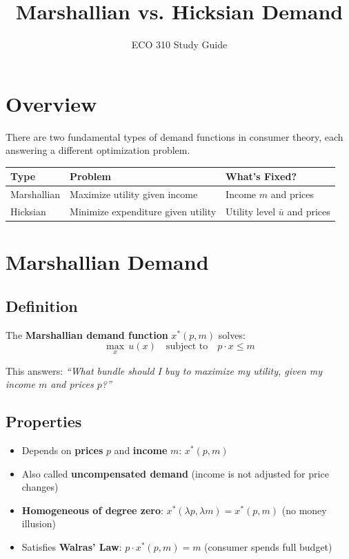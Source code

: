 \documentclass[11pt]{article}
\title{Marshallian vs. Hicksian Demand}
\author{ECO 310 Study Guide}
\date{}
\begin{document}
\maketitle

\section{Overview}

There are two fundamental types of demand functions in consumer theory, each answering a different optimization problem.

\begin{center}
\begin{tabular}{|l|l|l|}
\hline
\textbf{Type} & \textbf{Problem} & \textbf{What's Fixed?} \\
\hline
Marshallian & Maximize utility given income & Income $m$ and prices \\
Hicksian & Minimize expenditure given utility & Utility level $\bar{u}$ and prices \\
\hline
\end{tabular}
\end{center}

\section{Marshallian Demand}

\subsection{Definition}

The \textbf{Marshallian demand function} $x^*(p, m)$ solves:
\[
\max_{x} \, u(x) \quad \text{subject to} \quad p \cdot x \leq m
\]

This answers: \textit{``What bundle should I buy to maximize my utility, given my income $m$ and prices $p$?''}

\subsection{Properties}

\begin{itemize}
    \item Depends on \textbf{prices} $p$ and \textbf{income} $m$: $x^*(p, m)$
    \item Also called \textbf{uncompensated demand} (income is not adjusted for price changes)
    \item \textbf{Homogeneous of degree zero}: $x^*(\lambda p, \lambda m) = x^*(p, m)$ (no money illusion)
    \item Satisfies \textbf{Walras' Law}: $p \cdot x^*(p, m) = m$ (consumer spends full budget)
\end{itemize}
\end{document}
